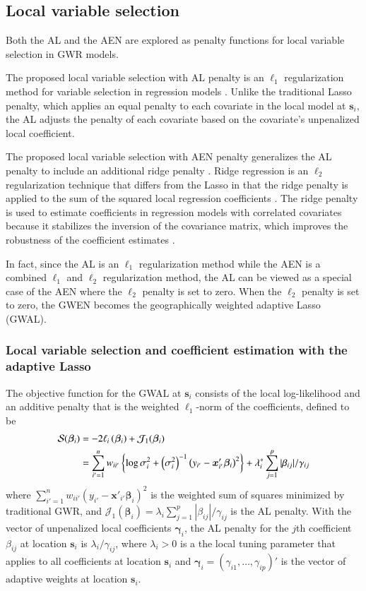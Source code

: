 \documentclass[authoryear, review, 11pt]{elsarticle}
\begin{document}
	\subsection{Local variable selection}
	Both the AL and the AEN are explored as penalty functions for local variable selection in GWR models.
	
	The proposed local variable selection with AL penalty is an $\ell_1$ regularization method for variable selection in regression models \citep{Zou:2006}. Unlike the traditional Lasso penalty, which applies an equal penalty to each covariate in the local model at $\bm{s}_i$, the AL adjusts the penalty of each covariate based on the covariate's unpenalized local coefficient.	
	
	The proposed local variable selection with AEN penalty generalizes the AL penalty to include an additional ridge penalty \citep{Zou:2009}. Ridge regression is an $\ell_2$ regularization technique that differs from the Lasso in that the ridge penalty is applied to the sum of the squared local regression coefficients \citep{Hoerl:1970}. The ridge penalty is used to estimate coefficients in regression models with correlated covariates because it stabilizes the inversion of the covariance matrix, which improves the robustness of the coefficient estimates \citep{Hastie:2009}.
	
	In fact, since the AL is an $\ell_1$ regularization method while the AEN is a combined $\ell_1$ and $\ell_2$ regularization method, the AL can be viewed as a special case of the AEN where the $\ell_2$ penalty is set to zero. When the $\ell_2$ penalty is set to zero, the GWEN becomes the geographically weighted adaptive Lasso (GWAL).
	
	\subsubsection{Local variable selection and coefficient estimation with the adaptive Lasso}
	The objective function for the GWAL at $\bm{s}_i$ consists of the local log-likelihood and an additive penalty that is the weighted $\ell_1$-norm of the coefficients, defined to be
	\begin{align}\label{eq:adaptive-lasso-WLS}
		\mathcal{S}(\bm{\beta}_i) &= -2\ell_i\left(\bm{\beta}_i\right) + \mathcal{J}_1(\bm{\beta}_i) \notag \\
		&= \sum_{i'=1}^n w_{ii'}  \left\{ \log{\sigma^2_i}  + \left(\sigma^2_i\right)^{-1}  \left(y_{i'} - \bm{x}'_{i'} \bm{\beta}_i \right)^2 \right\} +  \lambda^*_i \sum_{j=1}^p |\beta_{ij}| / \gamma_{ij}
	\end{align}
	where $\sum_{i'=1}^n w_{ii'} \left(y_{i'} - \bm{x}'_{i'} \bm{\beta}_i \right)^2$ is the weighted sum of squares minimized by traditional GWR, and $\mathcal{J}_1(\bm{\beta}_i) = \lambda_i \sum_{j=1}^p |\beta_{ij}| / \gamma_{ij}$ is the AL penalty. With the vector of unpenalized local coefficients $\bm{\gamma}_i$, the AL penalty for the $j$th coefficient $\beta_{ij}$ at location $\bm{s}_i$ is $\lambda_i / \gamma_{ij}$, where $\lambda_i > 0$ is a the local tuning parameter that applies to all coefficients at location $\bm{s}_i$ and $\bm{\gamma}_i = \left(\gamma_{i1}, \dots, \gamma_{ip}\right)'$ is the vector of adaptive weights at location $\bm{s}_i$.
\end{document}
